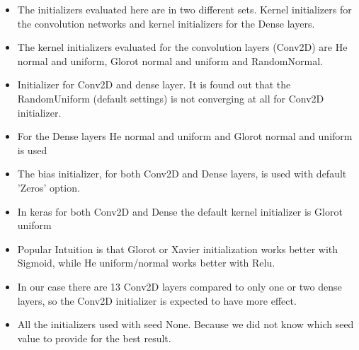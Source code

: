 \begin{itemize}
 \item The initializers evaluated here are in two different sets. Kernel initializers for the convolution networks and kernel initializers for the Dense layers. 
 \item The kernel initializers evaluated for the convolution layers (Conv2D) are He normal and uniform, Glorot normal and uniform and RandomNormal. 
 \item Initializer for Conv2D and dense layer. It is found out that the RandomUniform (default settings) is not converging at all for Conv2D initializer. 
 \item For the Dense layers He normal and uniform and Glorot normal and uniform is used
 \item The bias initializer, for both Conv2D and Dense layers, is used with default 'Zeros' option. %
 \item In keras for both Conv2D and Dense the default kernel initializer is Glorot uniform
 \item Popular Intuition is that Glorot or Xavier initialization works better with Sigmoid, while He uniform/normal works better with Relu.
 \item In our case there are 13 Conv2D layers compared to only one or two dense layers, so the Conv2D initializer is expected to have more effect.
 \item All the initializers used with seed None. Because we did not know which seed value to provide for the best result.

\end{itemize}


